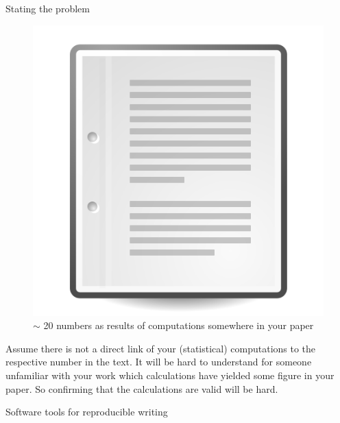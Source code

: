 \documentclass[final,hyperref={pdfpagelabels=false}]{beamer}
\begin{document}
\begin{frame}{}
\begin{columns}[t]
\begin{column}{.48\linewidth}
\begin{block}{Stating the problem}
\begin{minipage}[t]{0.55\textwidth}
\begin{figure}[ht]
             \includegraphics[valign=T,scale=.4]{logo/paper_icon}
                 \caption{ $\sim$ 20 numbers as results of computations somewhere in your paper} 
           \end{figure}
          \end{minipage}   
          \newline
          Assume there is not a direct link of your (statistical) computations to the respective number in the text.
          It will be hard to understand for someone unfamiliar with your work which calculations have yielded some figure in your paper. So confirming that the calculations are valid will be hard.  
         \end{block}     

      
      
  \begin{block}{Software tools for reproducible writing}
    

\end{block}
\end{column}
\end{columns}
\end{frame}
\end{document}
